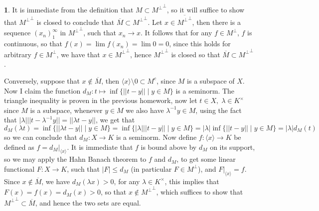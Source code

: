 \documentclass[10.5pt]{article}
\theoremstyle{definition}
\newtheorem{pb}{}
\newcommand{\set}[1]{\{#1\}}
\newcommand{\abs}[1]{\left\vert#1\right\vert}
\newcommand{\norm}[1]{\lvert\lvert#1\rvert\rvert}
\newcommand{\gen}[1]{\langle #1 \rangle}
\begin{document}
        \begin{pb}
            It is immediate from the definition that \(M \subset {M^\perp}^\perp\), so it will suffice to show that \({M^\perp}^\perp\) is closed to conclude that \(\overline{M} \subset {M^\perp}^\perp\). Let \(x \in \overline{{M^\perp}^\perp}\), then there is a sequence \((x_n)_1^\infty\) in \({M^\perp}^\perp\), such that \(x_n \to x\). It follows that for any \(f \in M^\perp\), \(f\) is continuous, so that \(f(x) = \lim f(x_n) = \lim 0 = 0\), since this holds for arbitrary \(f \in M^\perp\), we have that \(x \in {M^\perp}^\perp\), hence \({M^\perp}^\perp\) is closed so that \(\overline{M} \subset {M^\perp}^\perp\).

            Conversely, suppose that \(x \not \in \overline{M}\), then \(\gen{x} \setminus 0 \subset M^c\), since \(M\) is a subspace of \(X\). Now I claim the function \(d_M: t \mapsto \inf\set{\norm{t-y} \mid y \in M}\) is a seminorm. The triangle inequality is proven in the previous homework, now let \(t \in X, \; \lambda \in K^\times \) since \(M\) is a subspace, whenever \(y \in M\) we also have \(\lambda^{-1}y \in M\), using the fact that \(\abs{\lambda}\norm{t - \lambda^{-1}y} = \norm{\lambda t - y}\), we get that \[d_M(\lambda t) = \inf\set{\norm{\lambda t - y} \mid y \in M} = \inf\set{\abs{\lambda}\norm{t - y} \mid y \in M} = \abs{\lambda}\inf\set{\norm{t - y} \mid y \in M} = \abs{\lambda}d_M(t)\]
            so we can conclude that \(d_M: X \to K\) is a seminorm. Now define \(f: \gen{x} \to K\) be defined as \(f = d_M \vert_{\gen{x}}\). It is immediate that \(f\) is bound above by \(d_M\) on its support, so we may apply the Hahn Banach theorem to \(f\) and \(d_M\), to get some linear functional \(F: X \to K\), such that \(\abs{F} \leq d_M\) (in particular \(F \in M^\perp\)), and \(F\vert_{\gen{x}} = f\). Since \(x \not \in \overline{M}\), we have \(d_M(\lambda x) > 0\), for any \(\lambda \in K^\times\), this implies that \(F(x) = f(x) = d_M(x) > 0\), so that \(x \not \in {M^{\perp}}^\perp\), which suffices to show that \({M^\perp}^\perp \subset \overline{M}\), and hence the two sets are equal.
        \end{pb}
\end{document}
